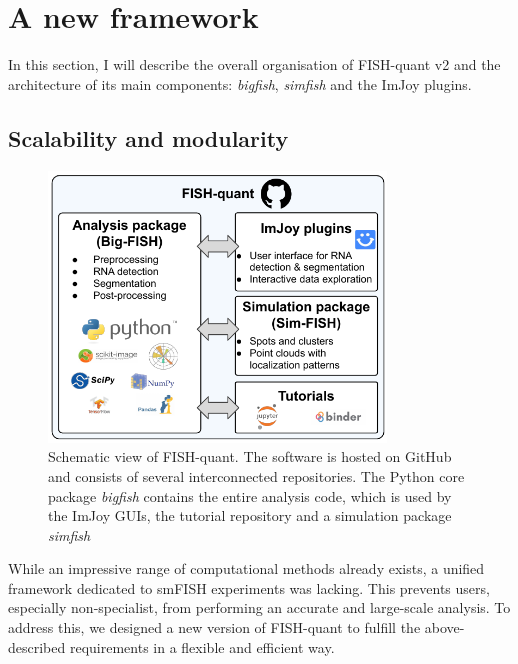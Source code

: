 
\section{A new framework}
\label{sec:fqv2}

In this section, I will describe the overall organisation of FISH-quant v2 and the architecture of its main components: \emph{bigfish}, \emph{simfish} and the ImJoy plugins.

\subsection{Scalability and modularity}
\label{subsec:framework}

\begin{figure}[h]
    \centering
    \includegraphics[width=0.8\textwidth]{figures/chapter1/schema_fishquant}
    \caption{Schematic view of FISH-quant.
	The software is hosted on GitHub and consists of several interconnected repositories.
	The Python core package \emph{bigfish} contains the entire analysis code, which is used by the ImJoy GUIs, the tutorial repository and a simulation package \emph{simfish}}
    \label{fig:fishquant}
\end{figure}

While an impressive range of computational methods already exists, a unified framework dedicated to \ac{smFISH} experiments was lacking.
This prevents users, especially non-specialist, from performing an accurate and large-scale analysis.
To address this, we designed a new version of FISH-quant to fulfill the above-described requirements in a flexible and efficient way.

